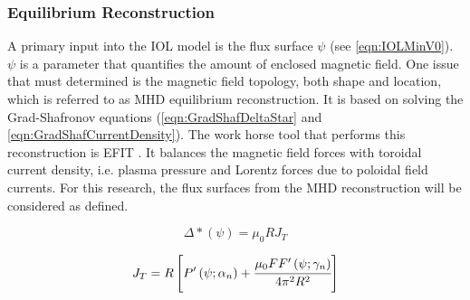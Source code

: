 \subsubsection{Equilibrium Reconstruction} \label{subsub:EFIT}
A primary input into the \ac{IOL} model is the flux surface $\psi$ (see \cref{eqn:IOLMinV0}). $\psi$ is a parameter that quantifies the amount of enclosed magnetic field. One issue that must determined is the magnetic field topology, both shape and location, which is referred to as MHD equilibrium reconstruction. It is based on solving the Grad-Shafronov equations (\cref{eqn:GradShafDeltaStar} and \cref{eqn:GradShafCurrentDensity}). The work horse tool that performs this reconstruction is EFIT \cite{Lao1990}. It balances the magnetic field forces with toroidal current density, i.e. plasma pressure and Lorentz forces due to poloidal field currents. For this research, the flux surfaces from the MHD reconstruction will be considered as defined.

\begin{equation}
	\Delta \ast \left(\psi\right) = \mu_0 R J_T
	\label{eqn:GradShafDeltaStar}
\end{equation}

\begin{equation}
	J_T = R \left[ P'\left(\psi; \alpha_n\right) + \cfrac{\mu_0 FF' \left(\psi; \gamma_n \right)}{4 \pi^2 R^2}\right]
	\label{eqn:GradShafCurrentDensity}
\end{equation}

